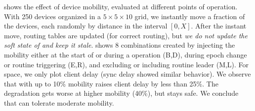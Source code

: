  shows the effect of device mobility, evaluated at different points of \sysname{} operation. With 250 devices organized in a $5 \times 5 \times 10$ grid, we instantly move a fraction of the devices, each randomly by distance in the interval $[0,X]$. After the instant move, routing 
tables are updated (for correct routing), but {\it we do not update the soft state of \sysname{} and keep it stale}.
 shows 8 combinations created by injecting the mobility either at the start of or during a \sysname{} operation (B,D), during epoch change or routine triggering (E,R), and excluding or including routine leader (M,L). For space, we only plot client delay (sync delay showed similar behavior). We observe that with up to 10\% mobility \sysname{} raises client delay by less than 25\%. The degradation gets worse at higher mobility (40\%), but \sysname{} stays safe.
We conclude that \sysname{} can tolerate moderate mobility. 

